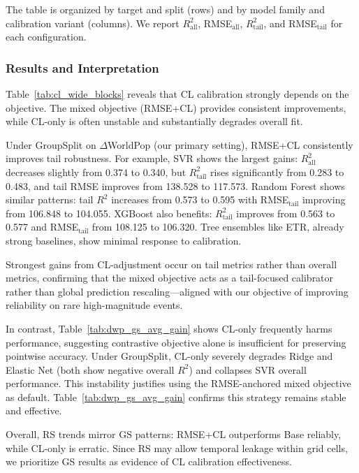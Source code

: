 \documentclass[11pt,conference,onecolumn]{IEEEtran}
\begin{document}
The table is organized by target and split (rows) and by model family and calibration variant (columns). We report $R^2_{\text{all}}$, RMSE$_{\text{all}}$, $R^2_{\text{tail}}$, and RMSE$_{\text{tail}}$ for each configuration.

\subsubsection{Results and Interpretation}

Table~\ref{tab:cl_wide_blocks} reveals that CL calibration strongly depends on the objective. The mixed objective (RMSE+CL) provides consistent improvements, while CL-only is often unstable and substantially degrades overall fit.

Under GroupSplit on $\Delta$WorldPop (our primary setting), RMSE+CL consistently improves tail robustness. For example, SVR shows the largest gains: $R^2_{\text{all}}$ decreases slightly from 0.374 to 0.340, but $R^2_{\text{tail}}$ rises significantly from 0.283 to 0.483, and tail RMSE improves from 138.528 to 117.573. Random Forest shows similar patterns: tail $R^2$ increases from 0.573 to 0.595 with RMSE$_{\text{tail}}$ improving from 106.848 to 104.055. XGBoost also benefits: $R^2_{\text{tail}}$ improves from 0.563 to 0.577 and RMSE$_{\text{tail}}$ from 108.125 to 106.320. Tree ensembles like ETR, already strong baselines, show minimal response to calibration.

Strongest gains from CL-adjustment occur on tail metrics rather than overall metrics, confirming that the mixed objective acts as a tail-focused calibrator rather than global prediction rescaling—aligned with our objective of improving reliability on rare high-magnitude events.

In contrast, Table~\ref{tab:dwp_gs_avg_gain} shows CL-only frequently harms performance, suggesting contrastive objective alone is insufficient for preserving pointwise accuracy. Under GroupSplit, CL-only severely degrades Ridge and Elastic Net (both show negative overall $R^2$) and collapses SVR overall performance. This instability justifies using the RMSE-anchored mixed objective as default. Table~\ref{tab:dwp_gs_avg_gain} confirms this strategy remains stable and effective.

Overall, RS trends mirror GS patterns: RMSE+CL outperforms Base reliably, while CL-only is erratic. Since RS may allow temporal leakage within grid cells, we prioritize GS results as evidence of CL calibration effectiveness.
\end{document}
